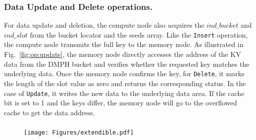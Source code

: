 \subsubsection{Data Update and Delete operations.}
For data update and deletion, the compute node also acquires the $ind\_bucket$ and $ind\_slot$ from the bucket locator and the seeds array. Like the \texttt{Insert} operation, the compute node transmits the full key to the memory node.
As illustrated in Fig.~\ref{fig:op:update}, the memory node directly accesses the address of the KV data from the DMPH bucket and verifies whether the requested key matches the underlying data. Once the memory node confirms the key, for \texttt{Delete}, it marks the length of the slot value as zero and returns the corresponding status. In the case of \texttt{Update}, it writes the new data to the underlying data area. 
If the cache bit is set to 1 and the keys differ, the memory node will go to the overflowed cache to get the data address.


\vspace{-.5ex}
\subsubsection{}
\label{sec:design:concurrency}



\begin{figure}[!t]
    \centering
    \begin{minipage}[b]{0.95\linewidth}
        \texttt{[image: Figures/extendible.pdf]}
        \vspace{-5ex}
    \end{minipage}
    \caption{}
    \vspace{-4ex}
    \label{fig:design:extendible}
\end{figure}



